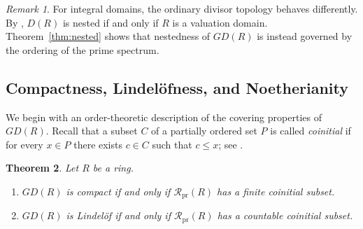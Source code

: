 \documentclass[11pt]{amsart}
\theoremstyle{plain}
\newtheorem{theorem}{Theorem}[section]
\theoremstyle{definition}
\theoremstyle{remark}
\newtheorem{remark}[theorem]{Remark}
\numberwithin{equation}{section}
\begin{document}
\begin{remark}
	For integral domains, the ordinary divisor topology behaves differently.
	By \cite[Theorem 2]{YigitKoc}, $D(R)$ is nested if and only if $R$ is
	a valuation domain. Theorem~\ref{thm:nested} shows that nestedness of
	$GD(R)$ is instead governed by the ordering of the prime spectrum.
\end{remark}


\subsection{Compactness, Lindel\"ofness, and Noetherianity}

We begin with an order-theoretic description of the covering properties
of $GD(R)$. 
Recall that a subset $C$ of a partially ordered set $P$ is called
\emph{coinitial} if for every $x\in P$ there exists $c\in C$ such that
$c\leq x$; see \cite[p.~46]{Roman}.

\begin{theorem}\label{thm:covering-coinitial}
	Let $R$ be a ring.
	\begin{enumerate}
		\item $GD(R)$ is compact if and only if
		$\mathcal R_{\mathrm{pr}}(R)$ has a finite coinitial subset.
		
		\item $GD(R)$ is Lindel\"of if and only if
		$\mathcal R_{\mathrm{pr}}(R)$ has a countable coinitial subset.
	\end{enumerate}
\end{theorem}
\end{document}
